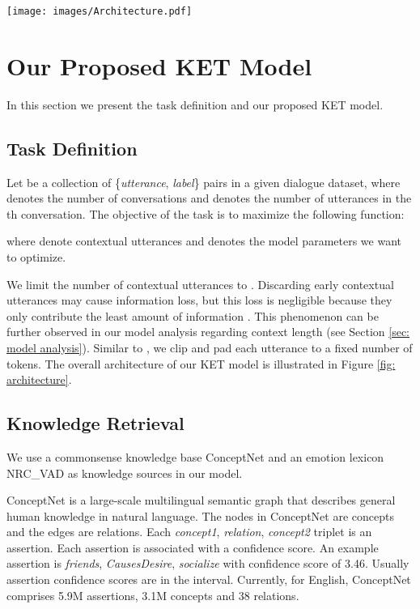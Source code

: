 \documentclass[11pt,a4paper]{article}
\begin{document}
\begin{figure*}[!t]
\centering
\texttt{[image: images/Architecture.pdf]}
\caption{Overall architecture of our proposed KET model. The positional encoding, residual connection, and layer normalization are omitted in the illustration for brevity.}
\label{fig: architecture}
\end{figure*}
\section{Our Proposed KET Model}
\label{our model}
In this section we present the task definition and our proposed KET model. 
\subsection{Task Definition}
\label{sec: task definition}
Let  be a collection of \{\textit{utterance}, \textit{label}\} pairs in a given dialogue dataset, where  denotes the number of conversations and  denotes the number of utterances in the th conversation. The objective of the task is to maximize the following function:

where  denote contextual utterances and  denotes the model parameters we want to optimize. 

We limit the number of contextual utterances to . Discarding early contextual utterances may cause information loss, but this loss is negligible because they only contribute the least amount of information \cite{su2018time}. This phenomenon can be further observed in our model analysis regarding context length (see Section \ref{sec: model analysis}). Similar to \cite{poria2017context}, we clip and pad each utterance  to a fixed  number of tokens. The overall architecture of our KET model is illustrated in Figure \ref{fig: architecture}.

\subsection{Knowledge Retrieval}
\label{sec: knowledge retrieval}
We use a commonsense knowledge base ConceptNet \cite{speer2017conceptnet} and an emotion lexicon NRC\_VAD \cite{mohammad2018obtaining} as knowledge sources in our model. 

ConceptNet is a large-scale multilingual semantic graph that describes general human knowledge in natural language. The nodes in ConceptNet are concepts and the edges are relations. Each \textit{concept1}, \textit{relation}, \textit{concept2} triplet is an assertion. Each assertion is associated with a confidence score. An example assertion is \textit{friends}, \textit{CausesDesire}, \textit{socialize} with confidence score of 3.46. Usually assertion confidence scores are in the  interval. Currently, for English, ConceptNet comprises 5.9M assertions, 3.1M concepts and 38 relations.
\end{document}
